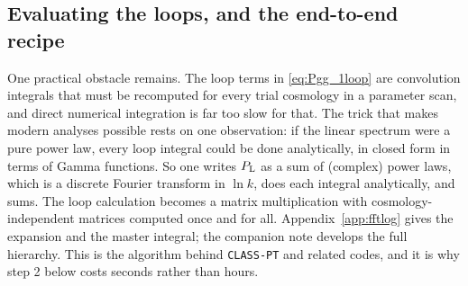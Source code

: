 \documentclass[a4paper,11pt]{article}
\def\Plin{P_{\rm L}}
\numberwithin{equation}{section}
\begin{document}
\subsection{Evaluating the loops, and the end-to-end recipe}
\label{sec:fftlog}

One practical obstacle remains. The loop terms in \eqref{eq:Pgg_1loop} are convolution integrals that must be recomputed for every trial cosmology in a parameter scan, and direct numerical integration is far too slow for that. The trick that makes modern analyses possible \cite{Simonovic2017,ClassPT2020} rests on one observation: if the linear spectrum were a pure power law, every loop integral could be done analytically, in closed form in terms of Gamma functions. So one writes $\Plin$ as a sum of (complex) power laws, which is a discrete Fourier transform in $\ln k$, does each integral analytically, and sums. The loop calculation becomes a matrix multiplication with cosmology-independent matrices computed once and for all. Appendix~\ref{app:fftlog} gives the expansion and the master integral; the companion note \cite{Nguyen2025} develops the full hierarchy. This is the algorithm behind \texttt{CLASS-PT} \cite{ClassPT2020} and related codes, and it is why step 2 below costs seconds rather than hours.
\end{document}
